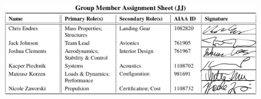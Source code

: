 \documentclass[conf]{new-aiaa}
\begin{document}


\newpage

\begin{figure}[!h]
    \centering
    \includegraphics[width=\linewidth]{Photos/signatures.JPG}
    \label{fig:my_label}
\end{figure}


\newpage
\tableofcontents
\renewcommand{\thesection}{\arabic{section}}
\end{document}
